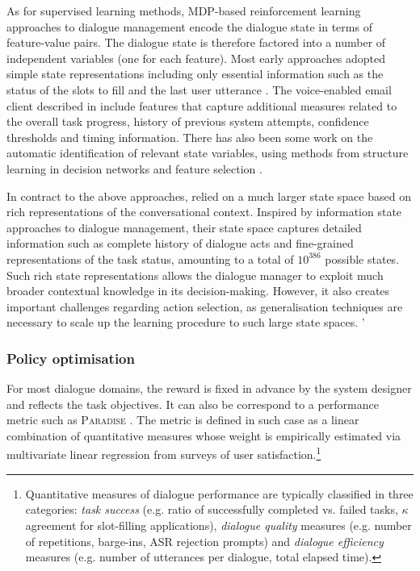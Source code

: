 As for supervised learning methods, MDP-based reinforcement learning approaches to dialogue management encode the dialogue state in terms of feature-value pairs.  The dialogue state is therefore factored into a number of independent variables (one for each feature).  Most early approaches adopted simple state representations including only essential information such as the status of the slots to fill and the last user utterance \citep{817450,Singh:2000:EER:647288.723412,Scheffler:2002}.  The voice-enabled email client described in \cite{Walker:2000} include features that capture additional measures related to the overall task progress, history of previous system attempts, confidence thresholds and timing information.  There has also been some work on the automatic identification of relevant state variables, using methods from structure learning in decision networks \citep{PaekC06} and feature selection \citep{tetreault2006using}. 

In contract to the above approaches, \cite{Henderson:2008} relied on a much larger state space based on rich representations of the conversational context. Inspired by information state approaches to dialogue management, their state space captures detailed information such as complete history of dialogue acts and fine-grained representations of the task status, amounting to a total of $10^{386}$ possible states.  Such rich state representations allows the dialogue manager to exploit much broader contextual knowledge in its decision-making.  However, it also creates important challenges regarding action selection, as generalisation techniques are necessary to scale up the learning procedure to such large state spaces.
'
\subsubsection{Policy optimisation}

For most dialogue domains, the reward is fixed in advance by the system designer and reflects the task objectives.  It can also be correspond to a performance metric such as \textsc{Paradise} \citep{Walker:2000}.  The metric is defined in such case as a linear combination of quantitative measures whose weight is empirically estimated via multivariate linear regression from surveys of user satisfaction.\footnote{Quantitative measures of dialogue performance are typically classified in three categories: \textit{task success} (e.g. ratio of successfully completed vs. failed tasks, $\kappa$ agreement for slot-filling applications), \textit{dialogue quality} measures (e.g. number of repetitions, barge-ins, ASR rejection prompts) and \textit{dialogue efficiency} measures (e.g. number of utterances per dialogue, total elapsed time).}

